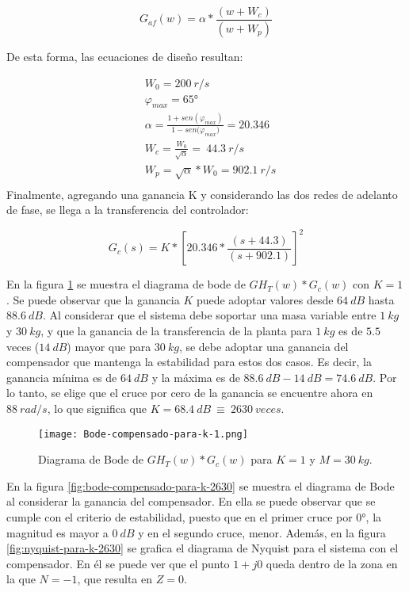 \begin{equation} \label{eq_tf_adelanto_dig}
	G_{af}(w)=\alpha*\frac{(w + W_c)}{(w + W_p)}
\end{equation}

\noindent De esta forma, las ecuaciones de diseño resultan:

\begin{equation*}
	\begin{aligned}
		&W_0 =200\:r/s\\
		&{\varphi }_{max} =65\textrm{°}\\
		&\alpha =\frac{1+sen({\varphi }_{max})}{1-sen{(\varphi }_{max})}=20.346\\
		&W_c =\frac{W_0}{\sqrt{\alpha }}=\ 44.3\:r/s\\
		&W_p =\sqrt{\alpha }*W_0=902.1\: r/s\\
	\end{aligned}
\end{equation*} 
\noindent Finalmente, agregando una ganancia K y considerando las dos redes de adelanto de fase, se llega a la transferencia del controlador:

\begin{equation}  
	G_c(s)=K*{[20.346*\frac{(s+44.3)}{(s+902.1)}]}^2
	\label{eq:transferencia-del-compensador}
\end{equation} 

En la figura \ref{fig:bode-compensado-para-k-1} se muestra el diagrama de bode de ${GH}_T(w)*G_c(w)$ con $K=1$. Se puede observar que la ganancia $K$ puede adoptar valores desde $64\:dB$ hasta $88.6\:dB$. Al considerar que el sistema debe soportar una masa variable entre $1\:kg$ y $30\:kg$, y que la ganancia de la transferencia de la planta para $1\:kg$ es de $5.5$ veces ($14\:dB$) mayor que para $30\:kg$, se debe adoptar una ganancia del compensador que mantenga la estabilidad para estos dos casos. Es decir, la ganancia m\'{i}nima es de $64\:dB$ y la m\'{a}xima es de $88.6\:dB - 14\:dB = 74.6\:dB$. Por lo tanto, se elige que el cruce por cero de la ganancia se encuentre ahora en $88\:rad/s$, lo que significa que $K=68.4\:dB\ \equiv \ 2630\:veces$.

\begin{figure}[H]
	\centering
	\texttt{[image: Bode-compensado-para-k-1.png]}
	\caption{Diagrama de Bode de $GH_T(w)*G_c(w)$ para $K=1$ y $M=30\:kg$.}
	\label{fig:bode-compensado-para-k-1}
\end{figure}
 
En la figura \ref{fig:bode-compensado-para-k-2630} se muestra el diagrama de Bode al considerar la ganancia del compensador. En ella se puede observar que se  cumple con el criterio de estabilidad, puesto que en el primer cruce por 0°, la magnitud es mayor a $0\:dB$ y en el segundo cruce, menor. Además, en la figura \ref{fig:nyquist-para-k-2630} se grafica el diagrama de Nyquist para el sistema con el compensador. En él se puede ver que el punto $1+j0$ queda dentro de la zona en la que $N=-1$, que resulta en $Z=0$.

